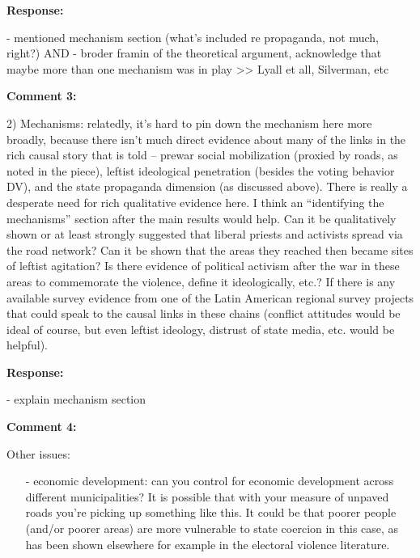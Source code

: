 \documentclass[12pt, a4paper, notitlepage]{article}
\begin{document}
\noindent\textbf{Response:} {}

- mentioned mechanism section (what's included re propaganda, not much, right?)
AND
- broder framin of the theoretical argument, acknowledge that maybe more than one mechanism was in play >> Lyall et all, Silverman, etc

\vspace{15pt}
\noindent\textbf{Comment 3:}
\begin{displayquote}
2) Mechanisms: relatedly, it’s hard to pin down the mechanism here more broadly, because there isn’t much direct evidence about many of the links in the rich causal story that is told – prewar social mobilization (proxied by roads, as noted in the piece), leftist ideological penetration (besides the voting behavior DV), and the state propaganda dimension (as discussed above). There is really a desperate need for rich qualitative evidence here. I think an “identifying the mechanisms” section after the main results would help. Can it be qualitatively shown or at least strongly suggested that liberal priests and activists spread via the road network? Can it be shown that the areas they reached then became sites of leftist agitation? Is there evidence of political activism after the war in these areas to commemorate the violence, define it ideologically, etc.? If there is any available survey evidence from one of the Latin American regional survey projects that could speak to the causal links in these chains (conflict attitudes would be ideal of course, but even leftist ideology, distrust of state media, etc. would be helpful).
\end{displayquote}

\noindent\textbf{Response:}  {}

- explain mechanism section

\vspace{15pt}
\noindent\textbf{Comment 4:}
\begin{displayquote}
Other issues:

\begin{itemize}
\item[-] economic development: can you control for economic development across different municipalities? It is possible that with your measure of unpaved roads you’re picking up something like this. It could be that poorer people (and/or poorer areas) are more vulnerable to state coercion in this case, as has been shown elsewhere for example in the electoral violence literature.
\end{itemize}
\end{displayquote}
\end{document}
